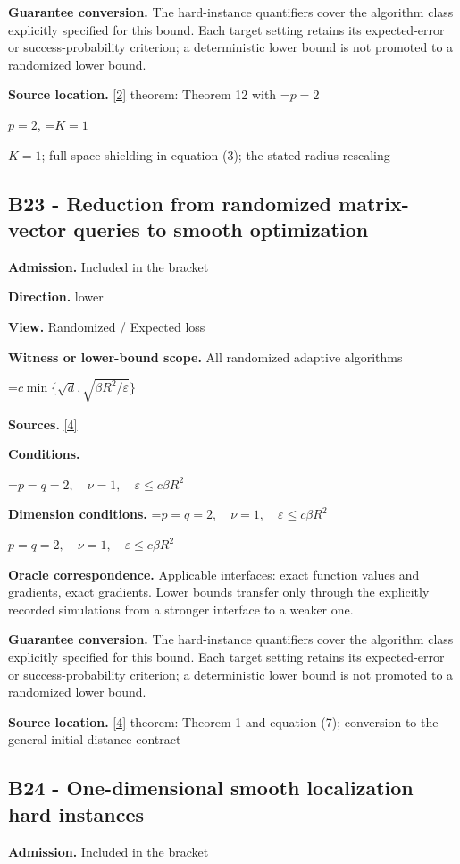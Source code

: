 \documentclass[10pt,a4paper]{article}
\newcommand{\AtlasMath}[1]{\par\begingroup\centering\setbox0=\hbox{$\displaystyle #1$}\ifdim\wd0>1.4\linewidth\typeout{ATLAS WIDE FORMULA: \the\wd0}\fi\ifdim\wd0>\linewidth\resizebox{\linewidth}{!}{\box0}\else\box0\fi\par\endgroup}
\newcommand{\AtlasInlineMath}[1]{\begingroup\setbox0=\hbox{$#1$}\ifdim\wd0>.4\linewidth\endgroup\AtlasMath{#1}\else\endgroup$#1$\fi}
\begin{document}
\textbf{Guarantee conversion.} The hard-instance quantifiers cover the algorithm class explicitly specified for this bound. Each target setting retains its expected-error or success-probability criterion; a deterministic lower bound is not promoted to a randomized lower bound.

\textbf{Source location.} \href{https://proceedings.mlr.press/v99/diakonikolas19c/diakonikolas19c.pdf}{[2]} theorem: Theorem 12 with \AtlasInlineMath{p=2}, \AtlasInlineMath{K=1}; full-space shielding in equation (3); the stated radius rescaling

\subsection{B23 - Reduction from randomized matrix-vector queries to smooth optimization}
\textbf{Admission.} Included in the bracket

\textbf{Direction.} lower

\textbf{View.} Randomized / Expected loss

\textbf{Witness or lower-bound scope.} All randomized adaptive algorithms

\AtlasMath{c\min\{\sqrt d,\sqrt{\beta R^2/\varepsilon}\}}
\textbf{Sources.} \href{https://arxiv.org/pdf/2609.10874}{[4]}

\textbf{Conditions.} 
\AtlasMath{p=q=2,\quad\nu=1,\quad\varepsilon\le c\beta R^2}


\textbf{Dimension conditions.} \AtlasInlineMath{p=q=2,\quad\nu=1,\quad\varepsilon\le c\beta R^2}

\textbf{Oracle correspondence.} Applicable interfaces: exact function values and gradients, exact gradients. Lower bounds transfer only through the explicitly recorded simulations from a stronger interface to a weaker one.

\textbf{Guarantee conversion.} The hard-instance quantifiers cover the algorithm class explicitly specified for this bound. Each target setting retains its expected-error or success-probability criterion; a deterministic lower bound is not promoted to a randomized lower bound.

\textbf{Source location.} \href{https://arxiv.org/pdf/2609.10874}{[4]} theorem: Theorem 1 and equation (7); conversion to the general initial-distance contract

\subsection{B24 - One-dimensional smooth localization hard instances}
\textbf{Admission.} Included in the bracket
\end{document}
